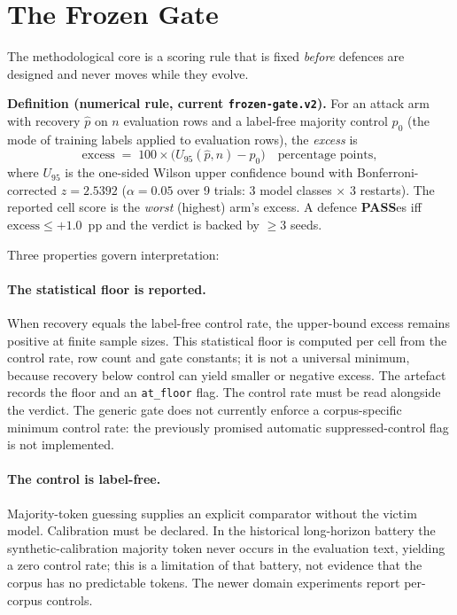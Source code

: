 \documentclass[11pt]{article}
\newcommand{\pp}{pp}
\begin{document}
\section{The Frozen Gate}
\label{sec:gate}

The methodological core is a scoring rule that is fixed \emph{before}
defences are designed and never moves while they evolve.

\noindent\textbf{Definition (numerical rule, current \texttt{frozen-gate.v2}).}
For an attack arm with recovery $\hat{p}$ on $n$ evaluation rows and a
label-free majority control $p_0$ (the mode of training labels applied to
evaluation rows), the \emph{excess} is
\[
\mathrm{excess} \;=\;
100 \times \bigl( U_{95}(\hat{p}, n) - p_0 \bigr)
\quad\text{percentage points},
\]
where $U_{95}$ is the one-sided Wilson upper confidence bound with
Bonferroni-corrected $z = 2.5392$ ($\alpha = 0.05$ over 9 trials: 3 model
classes $\times$ 3 restarts). The reported cell score is the
\emph{worst} (highest) arm's excess. A defence \textbf{PASS}es iff
$\mathrm{excess} \le +1.0$~\pp{} and the verdict is backed by $\ge 3$
seeds.

Three properties govern interpretation:

\paragraph{The statistical floor is reported.}
When recovery equals the label-free control rate, the upper-bound excess remains positive at finite sample sizes. This statistical floor is computed per cell from the control rate, row count and gate constants; it is not a universal minimum, because recovery below control can yield smaller or negative excess. The artefact records the floor and an \texttt{at\_floor} flag. The control rate must be read alongside the verdict. The generic gate does not currently enforce a corpus-specific minimum control rate: the previously promised automatic suppressed-control flag is not implemented.

\paragraph{The control is label-free.}
Majority-token guessing supplies an explicit comparator without the victim model. Calibration must be declared. In the historical long-horizon battery the synthetic-calibration majority token never occurs in the evaluation text, yielding a zero control rate; this is a limitation of that battery, not evidence that the corpus has no predictable tokens. The newer domain experiments report per-corpus controls.
\end{document}
